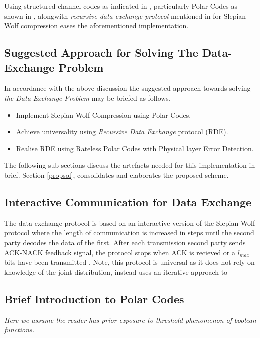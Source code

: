 \documentclass[
11pt, %
a4paper, %
oneside, %
headinclude,footinclude, %
BCOR5mm, %
]{scrartcl}
\begin{document}
Using structured channel codes as indicated in \cite{discus}, particularly Polar Codes as shown in \cite{pslep}, alongwith \emph{recursive data exchange protocol}  mentioned in \cite{htsw} for Slepian-Wolf compression eases the aforementioned implementation. 

\subsection{Suggested Approach for Solving The Data-Exchange Problem}
In accordance with the above discussion the suggested approach towards solving \emph{the Data-Exchange Problem} may be briefed as follows.
\begin{itemize}
\item{Implement Slepian-Wolf Compression using Polar Codes.}
\item{Achieve universality using \emph{Recursive Data Exchange} protocol (RDE).}
\item{Realise RDE using Rateless Polar Codes with Physical layer Error Detection.}
\end{itemize}

The following sub-sections discuss the artefacts needed for this implementation in brief. Section \ref{propsol}, consolidates and elaborates the proposed scheme. 

\subsection{Interactive Communication for Data Exchange}
The data exchange protocol is based on an interactive version of the Slepian-Wolf protocol where the length of communication is increased in steps until the second party decodes the data of the first. After each transmission second party sends ACK-NACK feedback signal, the protocol stops when ACK is recieved or a $l_{max}$ bits have been transmitted \cite{htsw}. Note, this protocol is universal as it does not rely on knowledge of the joint distribution, instead uses an iterative approach to 


\subsection{Brief Introduction to Polar Codes}
\emph{Here we assume the reader has prior exposure to threshold phenomenon of boolean functions.}
\end{document}
